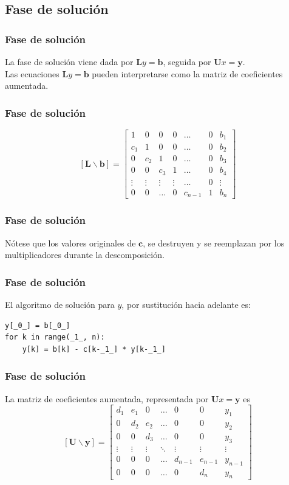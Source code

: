 \subsection{Fase de solución}
\begin{frame}
\frametitle{Fase de solución}
La fase de solución viene dada por $\mathbf{L}y = \mathbf{b}$, seguida por $\mathbf{U}x = \mathbf{y}$.
\\
\medskip
Las ecuaciones $\mathbf{L} y = \mathbf{b}$ pueden interpretarse como la matriz de coeficientes aumentada.
\end{frame}
\begin{frame}
\frametitle{Fase de solución}
\[  [\mathbf{L} \backslash \mathbf{b}] =
\begin{bmatrix}
1 & 0 & 0 & 0 & \ldots & 0 & b_{1} \\
c_{1} & 1 & 0 & 0 & \ldots & 0 & b_{2} \\
0 & c_{2} & 1 & 0 & \ldots & 0 & b_{3} \\
0 & 0 & c_{3} & 1 & \ldots & 0 & b_{4} \\
\vdots & \vdots & \vdots & \vdots & \ldots & 0 & \vdots \\
0 & 0 & \ldots & 0 & c_{n-1} & 1 & b_{n}
\end{bmatrix} \]
\end{frame}
\begin{frame}[fragile]
\frametitle{Fase de solución}
Nótese que los valores originales de $\mathbf{c}$, se destruyen y se reemplazan por los multiplicadores durante la descomposición.
\end{frame}
\begin{frame}[fragile]
\frametitle{Fase de solución}
El algoritmo de solución para $y$, por sustitución hacia adelante es:
\begin{lstlisting}[caption=Sustitución hacia adelante, style=FormattedNumber, basicstyle=\linespread{1.1}\ttfamily=\small, columns=fullflexible]
y[_0_] = b[_0_]
for k in range(_1_, n):
    y[k] = b[k] - c[k-_1_] * y[k-_1_]
\end{lstlisting}
\end{frame}
\begin{frame}
\frametitle{Fase de solución}
La matriz de coeficientes aumentada, representada por $\mathbf{U}x = \mathbf{y}$ es
\[  [\mathbf{U} \backslash \mathbf{y}] =
\begin{bmatrix}
d_{1} & e_{1} & 0 & \ldots & 0 & 0 & y_{1} \\
0 & d_{2} & e_{2} & \ldots & 0 & 0 & y_{2} \\
0 & 0 & d_{3} & \ldots & 0 & 0 & y_{3} \\
\vdots & \vdots & \vdots & \ddots & \vdots & \vdots & \vdots \\
0 & 0 & 0 & \ldots & d_{n-1} & e_{n-1} & y_{n-1} \\
0 & 0 & 0 & \ldots & 0 & d_{n} & y_{n}
\end{bmatrix} \]
\end{frame}
